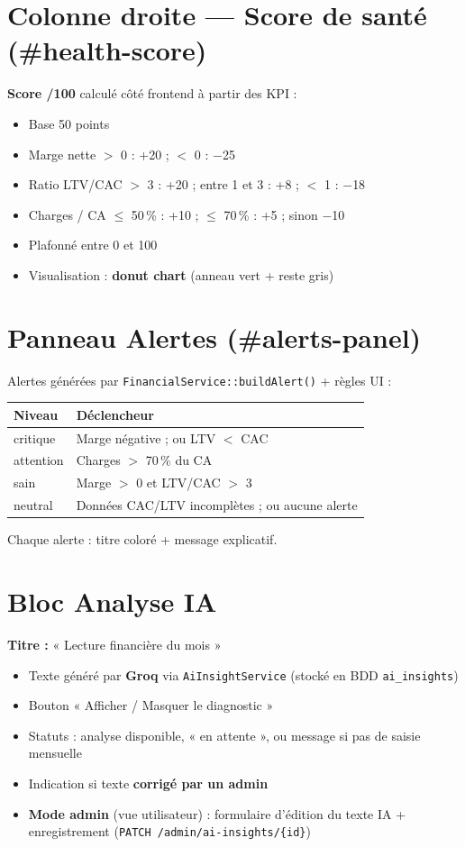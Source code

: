 \documentclass[11pt,a4paper]{report}
\newcommand{\filepath}[1]{\texttt{\small #1}}
\newcommand{\route}[1]{\texttt{\small #1}}
\begin{document}
\section{Colonne droite — Score de santé (\#health-score)}

\textbf{Score /100} calculé côté frontend à partir des KPI :

\begin{itemize}[leftmargin=1.5em]
    \item Base 50 points
    \item Marge nette $>$ 0 : +20 ; $<$ 0 : $-$25
    \item Ratio LTV/CAC $>$ 3 : +20 ; entre 1 et 3 : +8 ; $<$ 1 : $-$18
    \item Charges / CA $\leq$ 50\,\% : +10 ; $\leq$ 70\,\% : +5 ; sinon $-$10
    \item Plafonné entre 0 et 100
    \item Visualisation : \textbf{donut chart} (anneau vert + reste gris)
\end{itemize}

\section{Panneau Alertes (\#alerts-panel)}

Alertes générées par \filepath{FinancialService::buildAlert()} + règles UI :

\begin{longtable}{@{}p{2.5cm}p{11.8cm}@{}}
\toprule
\textbf{Niveau} & \textbf{Déclencheur} \\
\midrule
\endhead
critique & Marge négative ; ou LTV $<$ CAC \\
attention & Charges $>$ 70\,\% du CA \\
sain & Marge $>$ 0 et LTV/CAC $>$ 3 \\
neutral & Données CAC/LTV incomplètes ; ou aucune alerte \\
\bottomrule
\end{longtable}

Chaque alerte : titre coloré + message explicatif.

\section{Bloc Analyse IA}

\textbf{Titre :} « Lecture financière du mois »

\begin{itemize}[leftmargin=1.5em]
    \item Texte généré par \textbf{Groq} via \filepath{AiInsightService} (stocké en BDD \texttt{ai\_insights})
    \item Bouton « Afficher / Masquer le diagnostic »
    \item Statuts : analyse disponible, « en attente », ou message si pas de saisie mensuelle
    \item Indication si texte \textbf{corrigé par un admin}
    \item \textbf{Mode admin} (vue utilisateur) : formulaire d'édition du texte IA + enregistrement (\route{PATCH /admin/ai-insights/\{id\}})
\end{itemize}
\end{document}
